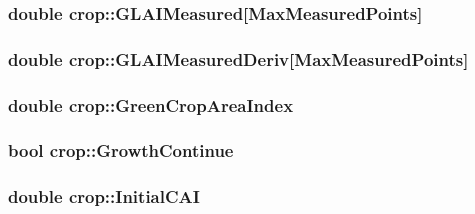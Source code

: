 \label{classcrop_a134737bfb7ce5b5c558f15a19232181f}
\hypertarget{classcrop_ad4423586042c12afedbec52624d26fe1}{
\subsubsection[{GLAIMeasured}]{\setlength{\rightskip}{0pt plus 5cm}double {\bf crop::GLAIMeasured}\mbox{[}MaxMeasuredPoints\mbox{]}}}
\label{classcrop_ad4423586042c12afedbec52624d26fe1}
\hypertarget{classcrop_a6bbccaab0f3df96f277d5891a27176b6}{
\subsubsection[{GLAIMeasuredDeriv}]{\setlength{\rightskip}{0pt plus 5cm}double {\bf crop::GLAIMeasuredDeriv}\mbox{[}MaxMeasuredPoints\mbox{]}}}
\label{classcrop_a6bbccaab0f3df96f277d5891a27176b6}
\hypertarget{classcrop_a2691a60a48a5166469df5da0e0e824fb}{
\subsubsection[{GreenCropAreaIndex}]{\setlength{\rightskip}{0pt plus 5cm}double {\bf crop::GreenCropAreaIndex}}}
\label{classcrop_a2691a60a48a5166469df5da0e0e824fb}
\hypertarget{classcrop_af82f3b3de55473a22e08c2b07d6e0645}{
\subsubsection[{GrowthContinue}]{\setlength{\rightskip}{0pt plus 5cm}bool {\bf crop::GrowthContinue}}}
\label{classcrop_af82f3b3de55473a22e08c2b07d6e0645}
\hypertarget{classcrop_af3aac84af1f2d62509c26dfe15d1756c}{
\subsubsection[{InitialCAI}]{\setlength{\rightskip}{0pt plus 5cm}double {\bf crop::InitialCAI}}}
